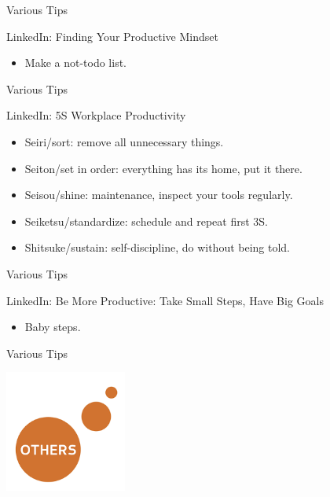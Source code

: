 \begin{frame}{Various Tips}
  \begin{block}{LinkedIn: Finding Your Productive Mindset}
    \begin{itemize}
      \item Make a not-todo list.
    \end{itemize}
  \end{block}
\end{frame}

\begin{frame}{Various Tips}
  \begin{block}{LinkedIn: 5S Workplace Productivity}
    \begin{itemize}
      \item Seiri/sort: remove all unnecessary things.
      \item Seiton/set in order: everything has its home, put it there.
      \item Seisou/shine: maintenance, inspect your tools regularly.
      \item Seiketsu/standardize: schedule and repeat first 3S.
      \item Shitsuke/sustain: self-discipline, do without being told.
    \end{itemize}
  \end{block}
\end{frame}

\begin{frame}{Various Tips}
  \begin{block}{LinkedIn: Be More Productive: Take Small Steps, Have Big Goals}
    \begin{itemize}
      \item Baby steps. 
    \end{itemize}
  \end{block}
\end{frame}

\begin{frame}{Various Tips}
  \begin{center}
    \includegraphics[height=4cm]{img/others.png}
  \end{center}
\end{frame}

